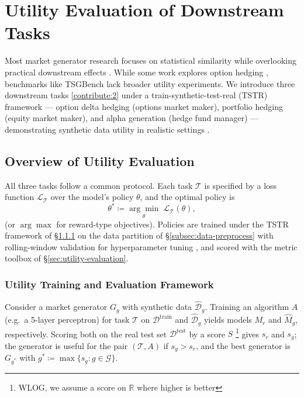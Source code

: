 \section{Utility Evaluation of Downstream Tasks}\label{sec:utility}
Most market generator research focuses on statistical similarity while
overlooking practical downstream effects \cite{Horvath2025, Stenger24}.
While some work explores option hedging \cite{Tanaka25,Boursin22}, benchmarks
like TSGBench lack broader utility experiments. We introduce three
downstream tasks \ref{contribute:2} under a train-synthetic-test-real (TSTR)
framework \cite{Leznik21, Stenger24} --- option delta hedging (options
market maker), portfolio hedging (equity market maker), and alpha generation
(hedge fund manager) --- demonstrating synthetic data utility in realistic
settings \cite{Horvath2025}.

\subsection{Overview of Utility Evaluation}
    All three tasks follow a common protocol. Each task
    \(\mathcal{T}\) is specified by a loss function
    \(\mathcal{L}_{\mathcal{T}}\) over the model's policy \(\theta\), and
    the optimal policy is
    \begin{equation}
      \theta^{*} \coloneq \underset{\theta}{\arg\min}\;
      \mathcal{L}_{\mathcal{T}}(\theta),
      \label{eq:utility-optimal-policy}
    \end{equation}
    (or \(\arg\max\) for reward-type objectives). Policies are trained
    under the TSTR framework of §\ref{sec:utility-training-framework} on
    the data partition of §\ref{subsec:data-preprocess} with rolling-window
    validation for hyperparameter tuning \cite{Leznik21}, and scored with
    the metric toolbox of §\ref{sec:utility-evaluation}.

    \subsubsection{Utility Training and Evaluation Framework}
    \label{sec:utility-training-framework}
      Consider a market generator \(G_g\) with synthetic data
      \(\hat{\mathcal{D}}_g\). Training an algorithm \(A\) (e.g.\ a 5-layer
      perceptron) for task \(\mathcal{T}\) on
      \(\mathcal{D}^{\mathrm{train}}\) and \(\hat{\mathcal{D}}_g\) yields
      models \(M_r\) and \(\hat{M}_g\), respectively. Scoring both on the
      real test set \(\mathcal{D}^{\mathrm{test}}\) by a score \(S\)
      \footnote{WLOG, we assume a score on \(\mathbb{R}\) where higher is
      better} gives \(s_r\) and \(s_g\); the generator is useful for the
      pair \((\mathcal{T}, A)\) if \(s_g > s_r\), and the best generator is
      \(G_{g^{*}}\) with
      \(g^{*} \coloneq \max\{s_g : g \in \mathcal{G}\}\).

